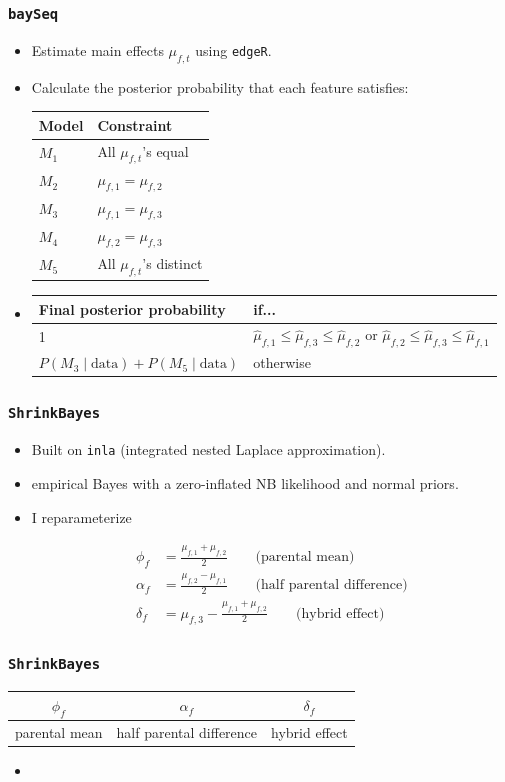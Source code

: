 \documentclass[handout]{beamer}
\providecommand{\wh}[1]{\widehat{#1}}
\numberwithin{equation}{section}
\begin{document}
\begin{frame}
\frametitle{{\tt baySeq}}
\begin{itemize}
\item Estimate main effects $\mu_{f, t}$ using {\tt edgeR}.
\pause \item Calculate the posterior probability that each feature satisfies:

\begin{center}
\begin{tabular}{l|l}
Model & Constraint \\ \hline
$M_1$ & All $\mu_{f, t}$'s equal \\
$M_2$ &  $\mu_{f, 1} = \mu_{f, 2}$ \\
$M_3$ & $\mu_{f, 1} = \mu_{f, 3}$ \\
$M_4$ & $\mu_{f, 2} = \mu_{f, 3}$ \\
$M_5$ &  All $\mu_{f, t}$'s distinct
\end{tabular}
\end{center}

\pause \item 
\begin{center}
\begin{tabular}{l|p{4cm}}
Final posterior probability & if... \\ \hline
1 & $\wh{\mu}_{f, 1} \le \wh{\mu}_{f, 3} \le \wh{\mu}_{f, 2}$ or $\wh{\mu}_{f, 2} \le \wh{\mu}_{f, 3} \le \wh{\mu}_{f, 1}$ \\
$P(M_3 \mid \text{data}) + P(M_5 \mid \text{data})$ & otherwise
\end{tabular}
\end{center}

\end{itemize}
\end{frame}


\begin{frame}
\frametitle{{\tt ShrinkBayes}}
\begin{itemize}
\item Built on {\tt inla} (integrated nested Laplace approximation).
\pause \item empirical Bayes with a zero-inflated NB likelihood and normal priors.
\pause \item I reparameterize

\begin{align*}
\phi_f &= \frac{\mu_{f, 1} + \mu_{f, 2}}{2} \qquad \text{(parental mean)} \\
\alpha_f &= \frac{\mu_{f, 2} - \mu_{f, 1}}{2} \qquad \text{(half parental difference)} \\
\delta_f &= \mu_{f, 3} - \frac{\mu_{f, 1} + \mu_{f, 2}}{2} \qquad \text{(hybrid effect)} 
\end{align*}
\end{itemize}
\end{frame}


\begin{frame}
\frametitle{{\tt ShrinkBayes}}


\tiny
\begin{tabular}{c|c|c}
$\phi_f$ & $\alpha_f$ & $\delta_f$ \\ \hline
parental mean & half parental difference & hybrid effect
\end{tabular}

\normalsize

\begin{itemize}
\item 
\end{itemize}


\end{frame}
\end{document}
